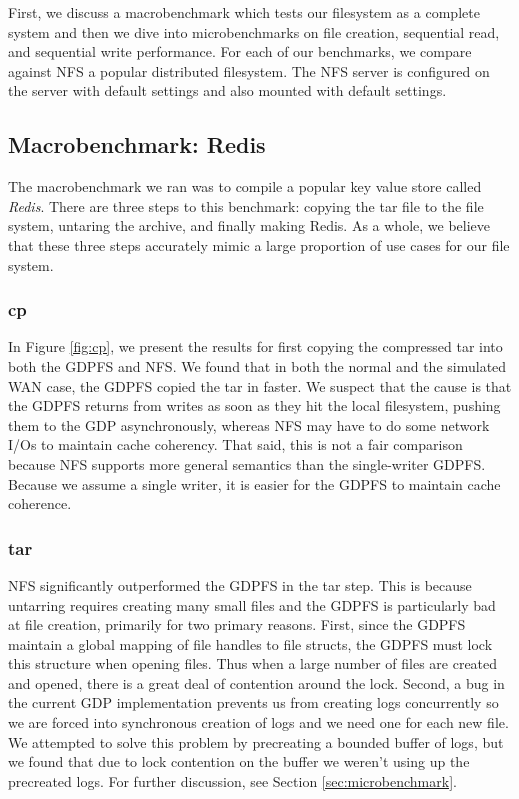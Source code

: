 \documentclass{acm_proc_article-sp}
\begin{document}
First, we discuss a macrobenchmark which tests our filesystem as a complete system and then we dive into microbenchmarks on file creation, sequential read, and sequential write performance. For each of our benchmarks, we compare against NFS a popular distributed filesystem. The NFS server is configured on the server with default settings and also mounted with default settings.

\subsection{Macrobenchmark: Redis}
The macrobenchmark we ran was to compile a popular key value store called \emph{Redis}. There are three steps to this benchmark: copying the tar file to the file system, untaring the archive, and finally making Redis. As a whole, we believe that these three steps accurately mimic a large proportion of use cases for our file system. 

\subsubsection{cp}

In Figure \ref{fig:cp}, we present the results for first copying the compressed tar into both the GDPFS and NFS. We found that in both the normal and the simulated WAN case, the GDPFS copied the tar in faster. We suspect that the cause is that the GDPFS returns from writes as soon as they hit the local filesystem, pushing them to the GDP asynchronously, whereas NFS may have to do some network I/Os to maintain cache coherency. That said, this is not a fair comparison because NFS supports more general semantics than the single-writer GDPFS. Because we assume a single writer, it is easier for the GDPFS to maintain cache coherence.

\subsubsection{tar}
NFS significantly outperformed the GDPFS in the tar step. This is because untarring requires creating many small files and the GDPFS is particularly bad at file creation, primarily for two primary reasons. First, since the GDPFS maintain a global mapping of file handles to file structs, the GDPFS must lock this structure when opening files. Thus when a large number of files are created and opened, there is a great deal of contention around the lock. Second, a bug in the current GDP implementation prevents us from creating logs concurrently so we are forced into synchronous creation of logs and we need one for each new file. We attempted to solve this problem by precreating a bounded buffer of logs, but we found that due to lock contention on the buffer we weren't using up the precreated logs. For further discussion, see Section \ref{sec:microbenchmark}.
\end{document}
